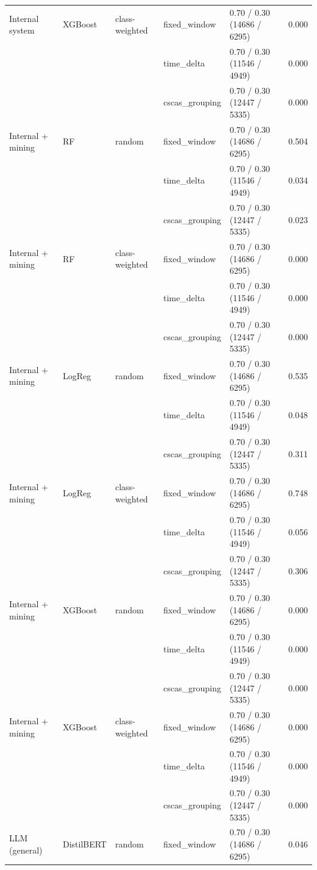 \begin{table}[htbp]
{\begin{tabular}{lllllc}
\addlinespace
Internal system & XGBoost & class-weighted & fixed\_window & 0.70 / 0.30 (14686 / 6295) & 0.000 \\
 &  &  & time\_delta & 0.70 / 0.30 (11546 / 4949) & 0.000 \\
 &  &  & cscas\_grouping & 0.70 / 0.30 (12447 / 5335) & 0.000 \\
\midrule
Internal + mining & RF & random & fixed\_window & 0.70 / 0.30 (14686 / 6295) & 0.504 \\
 &  &  & time\_delta & 0.70 / 0.30 (11546 / 4949) & 0.034 \\
 &  &  & cscas\_grouping & 0.70 / 0.30 (12447 / 5335) & 0.023 \\
\addlinespace
Internal + mining & RF & class-weighted & fixed\_window & 0.70 / 0.30 (14686 / 6295) & 0.000 \\
 &  &  & time\_delta & 0.70 / 0.30 (11546 / 4949) & 0.000 \\
 &  &  & cscas\_grouping & 0.70 / 0.30 (12447 / 5335) & 0.000 \\
\addlinespace
Internal + mining & LogReg & random & fixed\_window & 0.70 / 0.30 (14686 / 6295) & 0.535 \\
 &  &  & time\_delta & 0.70 / 0.30 (11546 / 4949) & 0.048 \\
 &  &  & cscas\_grouping & 0.70 / 0.30 (12447 / 5335) & 0.311 \\
\addlinespace
Internal + mining & LogReg & class-weighted & fixed\_window & 0.70 / 0.30 (14686 / 6295) & 0.748 \\
 &  &  & time\_delta & 0.70 / 0.30 (11546 / 4949) & 0.056 \\
 &  &  & cscas\_grouping & 0.70 / 0.30 (12447 / 5335) & 0.306 \\
\addlinespace
Internal + mining & XGBoost & random & fixed\_window & 0.70 / 0.30 (14686 / 6295) & 0.000 \\
 &  &  & time\_delta & 0.70 / 0.30 (11546 / 4949) & 0.000 \\
 &  &  & cscas\_grouping & 0.70 / 0.30 (12447 / 5335) & 0.000 \\
\addlinespace
Internal + mining & XGBoost & class-weighted & fixed\_window & 0.70 / 0.30 (14686 / 6295) & 0.000 \\
 &  &  & time\_delta & 0.70 / 0.30 (11546 / 4949) & 0.000 \\
 &  &  & cscas\_grouping & 0.70 / 0.30 (12447 / 5335) & 0.000 \\
\midrule
LLM (general) & DistilBERT & random & fixed\_window & 0.70 / 0.30 (14686 / 6295) & 0.046 \\

\end{tabular}}
\end{table}
